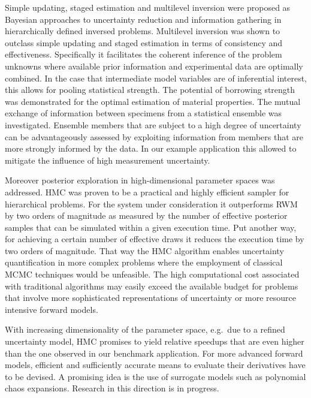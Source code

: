 Simple updating, staged estimation and multilevel inversion were proposed as Bayesian approaches to uncertainty reduction and information gathering in hierarchically defined inversed problems.
Multilevel inversion was shown to outclass simple updating and staged estimation in terms of consistency and effectiveness.
Specifically it facilitates the coherent inference of the problem unknowns where available prior information and experimental data are optimally combined.
In the case that intermediate model variables are of inferential interest, this allows for pooling statistical strength.
The potential of borrowing strength was demonstrated for the optimal estimation of material properties.
The mutual exchange of information between specimens from a statistical ensemble was investigated.
Ensemble members that are subject to a high degree of uncertainty can be advantageously assessed by exploiting information from members that are more strongly informed by the data.
In our example application this allowed to mitigate the influence of high measurement uncertainty.
\par %
Moreover posterior exploration in high-dimensional parameter spaces was addressed.
HMC was proven to be a practical and highly efficient sampler for hierarchical problems.
For the system under consideration it outperforms RWM by two orders of magnitude as measured by the number of effective posterior samples that can be simulated within a given execution time. 
Put another way, for achieving a certain number of effective draws it reduces the execution time by two orders of magnitude.
That way the HMC algorithm enables uncertainty quantification in more complex problems where the employment of classical MCMC techniques would be unfeasible.
The high computational cost associated with traditional algorithms may easily exceed the available budget
for problems that involve more sophisticated representations of uncertainty or more resource intensive forward models.
\par %
With increasing dimensionality of the parameter space, e.g.\ due to a refined uncertainty model, HMC promises to yield relative speedups that are even higher than the one observed in our benchmark application.
For more advanced forward models, efficient and sufficiently accurate means to evaluate their derivatives have to be devised.
A promising idea is the use of surrogate models such as polynomial chaos expansions.
Research in this direction is in progress.